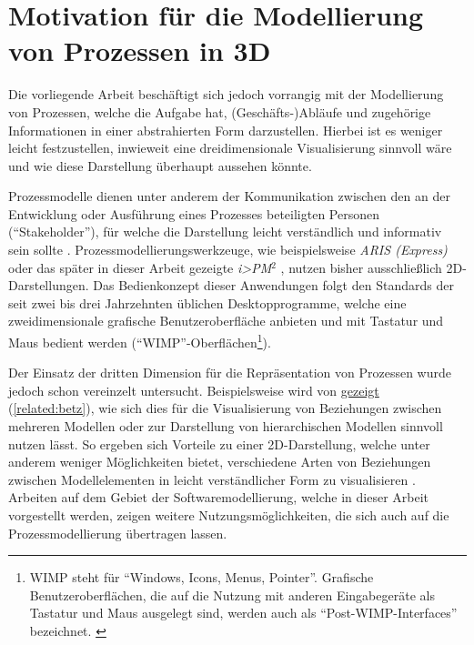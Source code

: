 \documentclass[a4paper,10pt]{sphinxmanual}
\begin{document}
\section{Motivation für die Modellierung von Prozessen in 3D}
\label{einleitung:motivation-fur-die-modellierung-von-prozessen-in-3d}
Die vorliegende Arbeit beschäftigt sich jedoch vorrangig mit der Modellierung von Prozessen, welche die Aufgabe hat, (Geschäfts-)Abläufe und zugehörige Informationen in einer abstrahierten Form darzustellen.
Hierbei ist es weniger leicht festzustellen, inwieweit eine dreidimensionale Visualisierung sinnvoll wäre und wie diese Darstellung überhaupt aussehen könnte.

Prozessmodelle dienen unter anderem der Kommunikation zwischen den an der Entwicklung oder Ausführung eines Prozesses beteiligten Personen ("`Stakeholder"'), für welche die Darstellung leicht verständlich und informativ sein sollte \cite{brown_conceptual_2010}.
Prozessmodellierungswerkzeuge, wie beispielsweise \emph{ARIS (Express)} \cite{scheer_aris_2000} oder das später in dieser Arbeit gezeigte \emph{i\textgreater{}PM}$^{\text{2}}$ \cite{roth_konzeption_2011}, nutzen bisher ausschließlich 2D-Darstellungen.
Das Bedienkonzept dieser Anwendungen folgt den Standards der seit zwei bis drei Jahrzehnten üblichen Desktopprogramme, welche eine zweidimensionale grafische Benutzeroberfläche anbieten und mit Tastatur und Maus bedient werden ("`WIMP"'-Oberflächen\footnote{
WIMP steht für "`Windows, Icons, Menus, Pointer"'. Grafische Benutzeroberflächen, die auf die Nutzung mit anderen Eingabegeräte als Tastatur und Maus ausgelegt sind, werden auch als "`Post-WIMP-Interfaces"' bezeichnet. \cite{van_dam_post-wimp_1997}
}).

Der Einsatz der dritten Dimension für die Repräsentation von Prozessen wurde jedoch schon vereinzelt untersucht.
Beispielsweise wird von \cite{betz_3d_2008} {\hyperref[related:betz]{gezeigt}} (\autoref*{related:betz}), wie sich dies für die Visualisierung von Beziehungen zwischen mehreren Modellen oder zur Darstellung von hierarchischen Modellen sinnvoll nutzen lässt.
So ergeben sich Vorteile zu einer 2D-Darstellung, welche unter anderem weniger Möglichkeiten bietet, verschiedene Arten von Beziehungen zwischen Modellelementen in leicht verständlicher Form zu visualisieren \cite{gil_three_1998}.
Arbeiten auf dem Gebiet der Softwaremodellierung, welche in dieser Arbeit vorgestellt werden, zeigen weitere Nutzungsmöglichkeiten, die sich auch auf die Prozessmodellierung übertragen lassen.
\end{document}
